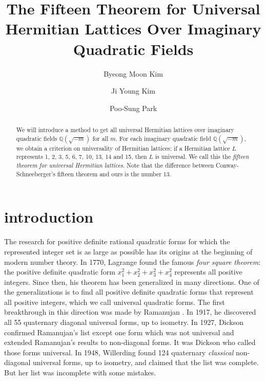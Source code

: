 \documentclass[a4paper,10pt,reqno]{amsart}
\title[The 15-Theorem for Universal Hermitian Lattices]{The Fifteen Theorem for Universal Hermitian Lattices Over
Imaginary Quadratic Fields}
\author[Byeong Moon Kim]{Byeong Moon Kim}
\author[Ji Young Kim]{Ji Young Kim}
\author[Poo-Sung Park]{Poo-Sung Park}
\begin{document}
\begin{abstract}
We will introduce a method to get all universal Hermitian lattices over imaginary quadratic fields
${\mathbb{Q}(\sqrt{{-m}})}$ for all $m$. For each imaginary quadratic field ${\mathbb{Q}(\sqrt{{-m}})}$, we obtain a criterion on
universality of Hermitian lattices: if a Hermitian lattice $L$ represents 1, 2, 3, 5, 6, 7, 10, 13,
14 and 15, then $L$ is universal. We call this the \emph{fifteen theorem for universal Hermitian
lattices}. Note that the difference between Conway-Schneeberger's fifteen theorem and ours is the
number 13.
\end{abstract}

\maketitle

\section{introduction}

The research for positive definite rational quadratic forms for which the represented integer set
is as large as possible has its origins at the beginning of modern number theory. In 1770, Lagrange
\cite{jlL_70} found the famous \emph{four square theorem}: the positive definite quadratic form
$x_1^2 + x_2^2 + x_3^2 +x_4^2$ represents all positive integers. Since then, his theorem has been
generalized in many directions. One of the generalizations is to find all positive definite
quadratic forms that represent all positive integers, which we call universal quadratic forms. The
first breakthrough in this direction was made by Ramanujan \cite{sR_17}. In 1917, he discovered all
55 quaternary diagonal universal forms, up to isometry. In 1927, Dickson \cite{leD_27} confirmed
Ramanujan's list except one form which was not universal and extended Ramanujan's results to
non-diagonal forms. It was Dickson who called those forms universal. In 1948, Willerding
\cite{mfW_48} found 124 quaternary \emph{classical} non-diagonal universal forms, up to isometry,
and claimed that the list was complete. But her list was incomplete with some mistakes.
\end{document}
